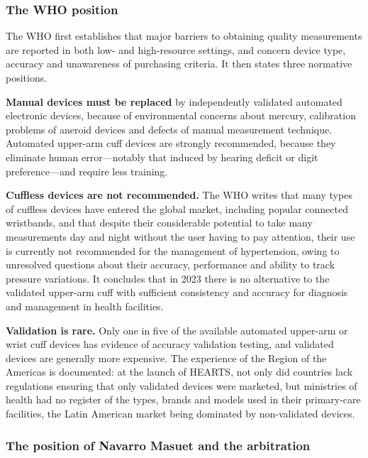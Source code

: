 \documentclass[12pt,a4paper,oneside]{report}
\begin{document}
\subsubsection{The WHO position}

The WHO first establishes that major barriers to obtaining quality measurements are reported in both low- and high-resource settings, and concern device type, accuracy and unawareness of purchasing criteria. It then states three normative positions.

\textbf{Manual devices must be replaced} by independently validated automated electronic devices, because of environmental concerns about mercury, calibration problems of aneroid devices and defects of manual measurement technique. Automated upper-arm cuff devices are strongly recommended, because they eliminate human error---notably that induced by hearing deficit or digit preference---and require less training.

\textbf{Cuffless devices are not recommended.} The WHO writes that many types of cuffless devices have entered the global market, including popular connected wristbands, and that despite their considerable potential to take many measurements day and night without the user having to pay attention, their use is currently not recommended for the management of hypertension, owing to unresolved questions about their accuracy, performance and ability to track pressure variations. It concludes that in 2023 there is no alternative to the validated upper-arm cuff with sufficient consistency and accuracy for diagnosis and management in health facilities.

\textbf{Validation is rare.} Only one in five of the available automated upper-arm or wrist cuff devices has evidence of accuracy validation testing, and validated devices are generally more expensive. The experience of the Region of the Americas is documented: at the launch of HEARTS, not only did countries lack regulations ensuring that only validated devices were marketed, but ministries of health had no register of the types, brands and models used in their primary-care facilities, the Latin American market being dominated by non-validated devices.

\subsubsection{The position of Navarro Masuet and the arbitration}
\end{document}
